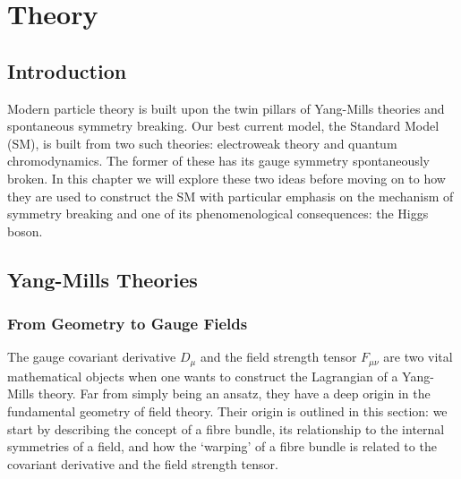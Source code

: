 \chapter{Theory}
\label{chap:theory}


\newpage

\section{Introduction}
Modern particle theory is built upon the twin pillars of Yang-Mills theories and spontaneous symmetry breaking. 
Our best current model, the Standard Model (SM), is built from two such theories: electroweak theory and quantum chromodynamics. The former of these has its gauge symmetry spontaneously broken. 
In this chapter we will explore these two ideas before moving on to how they are used to construct the SM with particular emphasis on the mechanism of symmetry breaking and one of its phenomenological consequences: the Higgs boson. 

\section{Yang-Mills Theories}
\subsection{From Geometry to Gauge Fields}
The gauge covariant derivative $D_{\mu}$ and the field strength tensor $F_{\mu\nu}$ are two vital mathematical objects when one wants to construct the Lagrangian of a Yang-Mills theory.
Far from simply being an ansatz, they have a deep origin in the fundamental geometry of field theory. 
Their origin is outlined in this section: we start by describing the concept of a fibre bundle, its relationship to the internal symmetries of a field, and how the `warping' of a fibre bundle is related to the covariant derivative and the field strength tensor.

